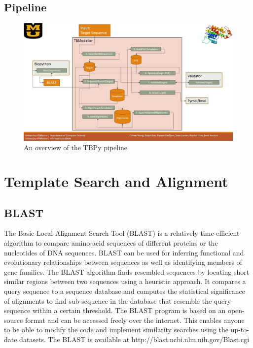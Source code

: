 \documentclass{article}
\begin{document}
\subsection{Pipeline}
\begin{figure}[H]
\begin{center}
\includegraphics[width=\textwidth]{workflow}
\caption{An overview of the TBPy pipeline}
\label{Fig:blosum}
\end{center}
\end{figure}

\section{Template Search and Alignment}

\subsection{BLAST}

The Basic Local Alignment Search Tool (BLAST) is a relatively time-efficient algorithm to compare amino-acid sequences of different proteins or the nucleotides of DNA sequences. BLAST can be used for inferring functional and evolutionary relationships between sequences as well as identifying members of gene families. The BLAST algorithm finds resembled sequences by locating short similar regions between two sequences using a heuristic approach. It compares a query sequence to a sequence database and computes the statistical significance of alignments to find sub-sequence in the database that resemble the query sequence within a certain threshold. The BLAST program is based on an open-source format and can be accessed freely over the internet. This enables anyone to be able to modify the code and implement similarity searches using the up-to-date datasets.
The BLAST is available at http://blast.ncbi.nlm.nih.gov/Blast.cgi
\end{document}
